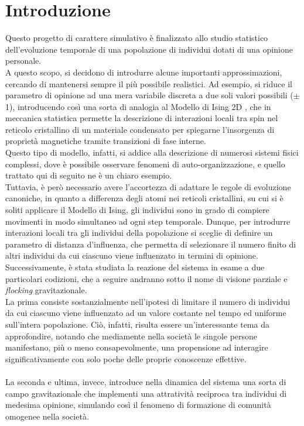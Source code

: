 \documentclass[letterpaper,10pt]{article}
\begin{document}
\section{Introduzione}
\label{Sec:2}
Questo progetto di carattere simulativo è finalizzato allo studio statistico dell'evoluzione temporale di una popolazione di individui dotati di una opinione personale. 
\\ A questo scopo, si decidono di introdurre alcune importanti approssimazioni, cercando di mantenersi sempre il più possibile realistici. Ad esempio, si riduce il parametro di opinione ad una mera variabile discreta a due soli valori possibili ($\pm$1), introducendo così una sorta di analogia al Modello di Ising 2D \cite{ising}, che in meccanica statistica permette la descrizione di interazioni locali tra spin nel reticolo cristallino di un materiale condensato per spiegarne l'insorgenza di proprietà magnetiche tramite transizioni di fase interne.
\\ Questo tipo di modello, infatti, si addice alla descrizione di numerosi sistemi fisici complessi, dove è possibile osservare fenomeni di auto-organizzazione, e quello trattato qui di seguito ne è un chiaro esempio. 
\\ Tuttavia, è però necessario avere l'accortezza di adattare le regole di evoluzione canoniche, in quanto a differenza degli atomi nei reticoli cristallini, su cui si è soliti applicare il Modello di Ising, gli individui sono in grado di compiere movimenti in modo simultaneo ad ogni step temporale. Dunque, per introdurre interazioni locali tra gli individui della popolazione si sceglie di definire un parametro di distanza d'influenza, che permetta di selezionare il numero finito di altri individui da cui ciascuno viene influenzato in termini di opinione.
\\ Successivamente, è stata studiata la reazione del sistema in esame a due particolari codizioni, che a seguire andranno sotto il nome di visione parziale e \textit{flocking} gravitazionale.
\\ La prima consiste sostanzialmente nell'ipotesi di limitare il numero di individui da cui ciascuno viene influenzato ad un valore costante nel tempo ed uniforme sull'intera popolazione. Ciò, infatti, risulta essere un'interessante tema da approfondire, notando che mediamente nella società le singole persone manifestano, più o meno consapevolmente, una propensione ad interagire significativamente con solo poche delle proprie conoscenze effettive.
\[\]
\\ La seconda e ultima, invece, introduce nella dinamica del sistema una sorta di campo gravitazionale che implementi una attratività reciproca tra individui di medesima opinione, simulando così il fenomeno di formazione di comunità omogenee nella società.
\end{document}
